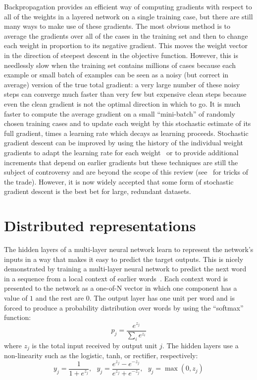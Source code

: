 \documentclass[10pts]{article}
\begin{document}
Backpropagation provides an efficient way of computing gradients with respect to all of
the weights in a layered network on a single training case, but there are
still many ways to make use of these gradients. The most obvious method is
to average the gradients over all of the cases in the training set and then
to change each weight in proportion to its negative gradient. This
moves the weight vector in the direction of steepest descent in the
objective function. 
However, this is needlessly slow when the 
training set contains millions of cases because each example or small batch of
examples can be seen as a noisy (but correct in average) version of the true total gradient: a very large
number of these noisy steps can converge much faster than very few but expensive clean steps because even
the clean gradient is not the optimal direction in which to go.
%
It is much faster to compute the average gradient
on a small ``mini-batch'' of randomly chosen training cases and to update
each weight by this stochastic estimate of its full gradient, times a
learning rate which decays as learning proceeds. Stochastic gradient
descent can be improved by using the history of the individual weight
gradients to adapt the learning rate for each weight~\citep{bottou-bousquet-2008-small}
or to provide additional increments that depend on earlier gradients 
but these techniques are still the subject of controversy and are beyond
the scope of this review (see~\citet{Montavon2012} for tricks of the trade). 
However, it is now widely accepted that some
form of stochastic gradient descent is the best bet for large, redundant
datasets.

\section{Distributed representations}

The hidden layers of a multi-layer neural network learn to represent the
network's inputs in a way that makes it easy to predict the target
outputs. This is nicely demonstrated by training a multi-layer neural
network to predict the next word in a sequence from a local context of
earlier words~\citep{BenDucVin01-short}. 
Each context word is presented to the network as a one-of-N
vector in which one component has a value of $1$ and the rest are $0$. The
output layer has one unit per word and is forced to produce a probability
distribution over words by using the ``softmax'' function:
\begin{equation}
p_j = \frac{e^{z_j}}{\sum_i e^{z_i}}
\end{equation}
where $z_j$ is the total input received by output unit $j$. The hidden
layers use a non-linearity such as the logistic, tanh, or rectifier, respectively:
\begin{equation}
y_j = \frac{1}{1+ e^{z_j}}, \ \ \ y_j = \frac{e^{z_j}-e^{-z_j}}{e^{z_j}+e^{-z_j}}, \ \ \
 y_j = \max(0, z_j)
\end{equation}
\end{document}
